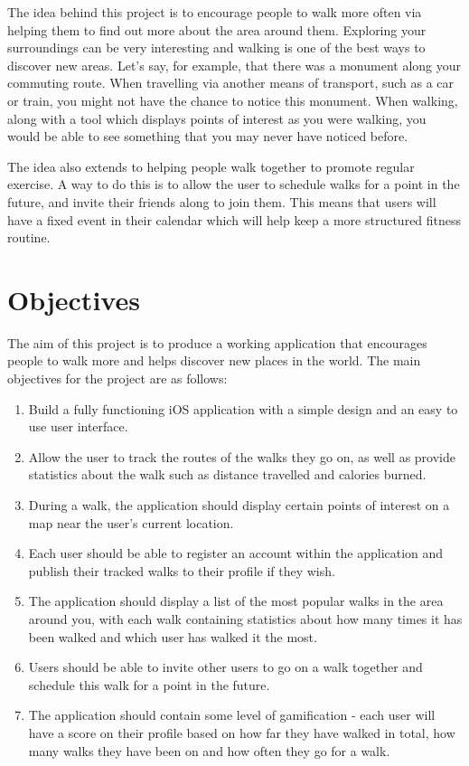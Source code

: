 The idea behind this project is to encourage people to walk more often via helping them to find out more about the area around them. Exploring your surroundings can be very interesting and walking is one of the best ways to discover new areas. Let's say, for example, that there was a monument along your commuting route. When travelling via another means of transport, such as a car or train, you might not have the chance to notice this monument. When walking, along with a tool which displays points of interest as you were walking, you would be able to see something that you may never have noticed before.

The idea also extends to helping people walk together to promote regular exercise. A way to do this is to allow the user to schedule walks for a point in the future, and invite their friends along to join them. This means that users will have a fixed event in their calendar which will help keep a more structured fitness routine.


\section{Objectives} \label{section:objectives}

The aim of this project is to produce a working application that encourages people to walk more and helps discover new places in the world. The main objectives for the project are as follows:

\begin{enumerate}[label=\textbf{Obj \arabic*}]
    \item Build a fully functioning iOS application with a simple design and an easy to use user interface.
    \item Allow the user to track the routes of the walks they go on, as well as provide statistics about the walk such as distance travelled and calories burned.
    \item During a walk, the application should display certain points of interest on a map near the user's current location.
    \item Each user should be able to register an account within the application and publish their tracked walks to their profile if they wish.
    \item The application should display a list of the most popular walks in the area around you, with each walk containing statistics about how many times it has been walked and which user has walked it the most.
    \item Users should be able to invite other users to go on a walk together and schedule this walk for a point in the future.
    \item The application should contain some level of gamification - each user will have a score on their profile based on how far they have walked in total, how many walks they have been on and how often they go for a walk.
\end{enumerate}







